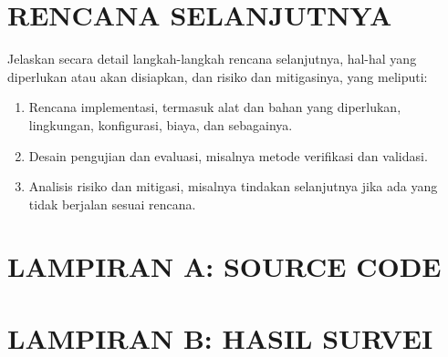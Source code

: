 \documentclass[12pt,a4paper,oneside]{book}
\begin{document}
\chapter{RENCANA SELANJUTNYA}
Jelaskan secara detail langkah-langkah rencana selanjutnya, hal-hal yang diperlukan atau akan disiapkan, dan risiko dan mitigasinya, yang meliputi:
\begin{enumerate}
\item	Rencana implementasi, termasuk alat dan bahan yang diperlukan, lingkungan, konfigurasi, biaya, dan sebagainya.
\item	Desain pengujian dan evaluasi, misalnya metode verifikasi dan validasi.
\item	Analisis risiko dan mitigasi, misalnya tindakan selanjutnya jika ada yang tidak berjalan sesuai rencana.
\end{enumerate}


\backmatter


\printbibliography[title={DAFTAR PUSTAKA}]

\appendix

\chapter{LAMPIRAN A: SOURCE CODE}

\chapter{LAMPIRAN B: HASIL SURVEI}
\end{document}
